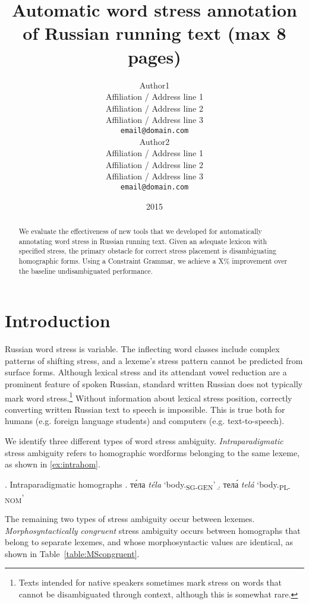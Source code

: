 \documentclass[11pt]{article}
\title{Automatic word stress annotation of Russian running text (max 8 pages)}
\author{Author1 \\
  Affiliation / Address line 1 \\
  Affiliation / Address line 2 \\
  Affiliation / Address line 3 \\
  {\tt email@domain.com} \\\And
  Author2 \\
  Affiliation / Address line 1 \\
  Affiliation / Address line 2 \\
  Affiliation / Address line 3 \\
  {\tt email@domain.com} \\}
\date{2015}
\newcommand{\rus}[1]{\foreignlanguage{russian}{#1}}
\begin{document}
\maketitle
\begin{abstract}
  We evaluate the effectiveness of new tools that we developed for automatically annotating 
  word stress in Russian running text. Given an adequate lexicon with specified stress, the
  primary obstacle for correct stress placement is disambiguating homographic forms. Using a
  Constraint Grammar, we achieve a X\% improvement over the baseline undisambiguated performance.
\end{abstract}

%

\section{Introduction}

Russian word stress is variable. The inflecting word classes include complex patterns of
shifting stress, and a lexeme's stress pattern cannot be predicted from surface forms.
Although lexical stress and its attendant vowel reduction are a prominent feature of
spoken Russian, standard written Russian does not typically mark word stress.\footnote{
Texts intended for native speakers sometimes mark stress on words that cannot be 
disambiguated through context, although this is somewhat rare.} Without information about lexical 
stress position, 
correctly converting written Russian text to speech is impossible. This is true both for humans
(e.g. foreign language students) and computers (e.g. text-to-speech).

We identify three different types of word stress ambiguity. \emph{Intraparadigmatic}
stress ambiguity refers
to homographic wordforms belonging to the same lexeme, as shown in \ref{ex:intrahom}. 

\ex. Intraparadigmatic homographs \label{ex:intrahom}
\a. \rus{т\'{е}ла} \emph{t\'{e}la} `body.\textsubscript{SG-GEN}' \label{ex:bodySGGEN}
\b. \rus{тел\'{а}} \emph{tel\'{a}} `body.\textsubscript{PL-NOM}' \label{ex:bodyPLNOM}

The remaining two types of stress ambiguity occur between lexemes. \emph{Morphosyntactically
congruent} stress ambiguity occurs between homographs that belong to separate lexemes, 
and whose morphosyntactic values are identical, as shown in Table~\ref{table:MScongruent}. 
\end{document}

